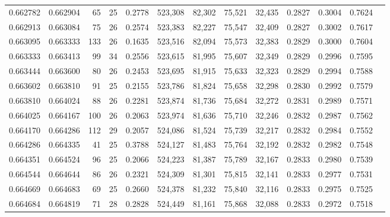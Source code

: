 \begin{tabular}{rrrrrrrrrrrrr}
0.662782 & 0.662904 &     65 &    25 &                                     0.2778 & 523,308 &  82,302 &  75,521 &  32,435 & 0.2827 & 0.3004 & 0.7624 \\
0.662913 & 0.663084 &     75 &    26 &                                     0.2574 & 523,383 &  82,227 &  75,547 &  32,409 & 0.2827 & 0.3002 & 0.7617 \\
0.663095 & 0.663333 &    133 &    26 &                                     0.1635 & 523,516 &  82,094 &  75,573 &  32,383 & 0.2829 & 0.3000 & 0.7604 \\
0.663333 & 0.663413 &     99 &    34 &                                     0.2556 & 523,615 &  81,995 &  75,607 &  32,349 & 0.2829 & 0.2996 & 0.7595 \\
0.663444 & 0.663600 &     80 &    26 &                                     0.2453 & 523,695 &  81,915 &  75,633 &  32,323 & 0.2829 & 0.2994 & 0.7588 \\
0.663602 & 0.663810 &     91 &    25 &                                     0.2155 & 523,786 &  81,824 &  75,658 &  32,298 & 0.2830 & 0.2992 & 0.7579 \\
0.663810 & 0.664024 &     88 &    26 &                                     0.2281 & 523,874 &  81,736 &  75,684 &  32,272 & 0.2831 & 0.2989 & 0.7571 \\
0.664025 & 0.664167 &    100 &    26 &                                     0.2063 & 523,974 &  81,636 &  75,710 &  32,246 & 0.2832 & 0.2987 & 0.7562 \\
0.664170 & 0.664286 &    112 &    29 &                                     0.2057 & 524,086 &  81,524 &  75,739 &  32,217 & 0.2832 & 0.2984 & 0.7552 \\
0.664286 & 0.664335 &     41 &    25 &                                     0.3788 & 524,127 &  81,483 &  75,764 &  32,192 & 0.2832 & 0.2982 & 0.7548 \\
0.664351 & 0.664524 &     96 &    25 &                                     0.2066 & 524,223 &  81,387 &  75,789 &  32,167 & 0.2833 & 0.2980 & 0.7539 \\
0.664544 & 0.664644 &     86 &    26 &                                     0.2321 & 524,309 &  81,301 &  75,815 &  32,141 & 0.2833 & 0.2977 & 0.7531 \\
0.664669 & 0.664683 &     69 &    25 &                                     0.2660 & 524,378 &  81,232 &  75,840 &  32,116 & 0.2833 & 0.2975 & 0.7525 \\
0.664684 & 0.664819 &     71 &    28 &                                     0.2828 & 524,449 &  81,161 &  75,868 &  32,088 & 0.2833 & 0.2972 & 0.7518 \\

\end{tabular}
